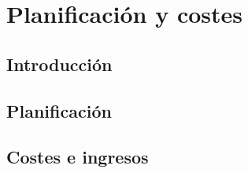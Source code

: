 \section{Planificación y costes}

\subsection{Introducción}
 

\subsection{Planificación}


\subsection{Costes e ingresos}

\newpage




